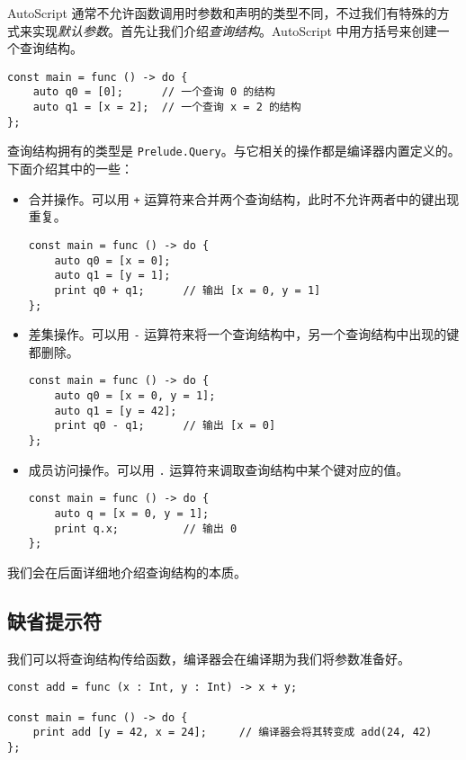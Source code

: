 AutoScript 通常不允许函数调用时参数和声明的类型不同，不过我们有特殊的方式来实现\emph{默认参数}。首先让我们介绍\emph{查询结构}。AutoScript 中用方括号来创建一个查询结构。

\begin{lstlisting}
const main = func () -> do {
    auto q0 = [0];      // 一个查询 0 的结构
    auto q1 = [x = 2];  // 一个查询 x = 2 的结构
};
\end{lstlisting}

查询结构拥有的类型是 \lstinline!Prelude.Query!。与它相关的操作都是编译器内置定义的。下面介绍其中的一些：

\begin{itemize}
    \item 合并操作。可以用 \lstinline!+! 运算符来合并两个查询结构，此时不允许两者中的键出现重复。

\begin{lstlisting}
const main = func () -> do {
    auto q0 = [x = 0];
    auto q1 = [y = 1];
    print q0 + q1;      // 输出 [x = 0, y = 1]
};
\end{lstlisting}

    \item 差集操作。可以用 \lstinline!-! 运算符来将一个查询结构中，另一个查询结构中出现的键都删除。

\begin{lstlisting}
const main = func () -> do {
    auto q0 = [x = 0, y = 1];
    auto q1 = [y = 42];
    print q0 - q1;      // 输出 [x = 0]
};
\end{lstlisting}

    \item 成员访问操作。可以用 \lstinline!.! 运算符来调取查询结构中某个键对应的值。

\begin{lstlisting}
const main = func () -> do {
    auto q = [x = 0, y = 1];
    print q.x;          // 输出 0
};
\end{lstlisting}
\end{itemize}

我们会在后面详细地介绍查询结构的本质。

\subsection{缺省提示符}

我们可以将查询结构传给函数，编译器会在编译期为我们将参数准备好。

\begin{lstlisting}
const add = func (x : Int, y : Int) -> x + y;

const main = func () -> do {
    print add [y = 42, x = 24];     // 编译器会将其转变成 add(24, 42)
};
\end{lstlisting}


